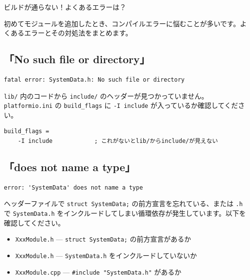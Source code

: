 \begin{qabox}{ビルドが通らない！よくあるエラーは？}

初めてモジュールを追加したとき、コンパイルエラーに悩むことが多いです。よくあるエラーとその対処法をまとめます。

\subsection{「No such file or directory」}

\begin{lstlisting}[language={},numbers=none,backgroundcolor=\color{warnred!5}]
fatal error: SystemData.h: No such file or directory
\end{lstlisting}

\texttt{lib/} 内のコードから \texttt{include/} のヘッダーが見つかっていません。\texttt{platformio.ini} の \texttt{build\_flags} に \texttt{-I include} が入っているか確認してください。

\begin{lstlisting}[language={},keywordstyle={},commentstyle=\color{gray}\itshape,morecomment={[l]{;}},numbers=none]
build_flags =
    -I include            ; これがないとlib/からinclude/が見えない
\end{lstlisting}

\subsection{「does not name a type」}

\begin{lstlisting}[language={},numbers=none,backgroundcolor=\color{warnred!5}]
error: 'SystemData' does not name a type
\end{lstlisting}

ヘッダーファイルで \texttt{struct SystemData;} の前方宣言を忘れている、または \texttt{.h} で \texttt{SystemData.h} をインクルードしてしまい循環依存が発生しています。以下を確認してください。

\begin{itemize}
  \item \texttt{XxxModule.h} — \texttt{struct SystemData;} の前方宣言があるか
  \item \texttt{XxxModule.h} — \texttt{SystemData.h} をインクルードしていないか
  \item \texttt{XxxModule.cpp} — \texttt{\#include "SystemData.h"} があるか
\end{itemize}


\end{qabox}
